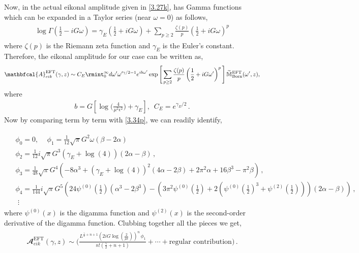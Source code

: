 \noindent 
Now, in the actual eikonal amplitude given in \eqref{3.27k}, has Gamma functions which can be expanded in a Taylor series (near $\omega=0$) as follows,
\begin{align}
 \begin{split}
\log{\Gamma\left(\frac{1}{2}-iG\omega\right)}=\gamma_E\left(\frac{1}{2}+i G\omega\right)+\sum_{p\geq 2}\frac{\zeta(p)}{p}\left(\frac{1}{2}+iG\omega\right)^{p}
 \end{split}   \end{align}
where $\zeta(p)$ is the Riemann zeta function and $\gamma_E$ is the Euler's constant.
Therefore, the eikonal amplitude for our case can be written as,
 \begin{align}
     \begin{split}
  \mathbfcal{A}^{\textrm{EFT}}_{eik}(\gamma,z)\sim C_E\rmint_0^\infty d\omega'\omega'^{\gamma/2-1}e^{i b \omega'}\exp\Bigg[\sum_{p\geq 2}\frac{\zeta(p)}{p}\left(\frac{1}{2}+iG\omega'\right)^{p}\Bigg]\,{\widetilde{\mathbb{M}}^{\textrm{EFT}}_{\textrm{Born}}(\omega',z)},
     \end{split}
 \end{align}
where \begin{align}
    b=G\left[\log\Bigg(\frac{ 4}{\mu^2 \epsilon^2}\Bigg)+\gamma_E\right],\,\,\, C_E=e^{\gamma_E /2}\,.
\end{align}
 Now by comparing term by term with  \eqref{3.34p}, we can readily identify,

\begin{align}\begin{split}
\label{3.36m}
 &\phi_0=0,\,\,\,\,\,\,\,\phi_1=\frac{1}{12} \sqrt{\pi } G^2 \omega  (\beta -2 \alpha )\,\\&\phi_2=\frac{1}{12} i \sqrt{\pi } G^3 (\gamma_E +\log (4)) (2 \alpha -\beta )\,,\\&\phi_3=\frac{1}{48} \sqrt{\pi } G^4 \left(-8 \alpha ^3+(\gamma_E +\log (4))^2 (4 \alpha -2 \beta )+2 \pi ^2 \alpha +16 \beta^3-\pi ^2 \beta \right)\,,\\&
 \phi_4=\frac{1}{144} i \sqrt{\pi } G^5 \left(24 \psi ^{(0)}\left(\frac{1}{2}\right) \left(\alpha ^3-2 \beta ^3\right)-\left(3 \pi ^2 \psi ^{(0)}\left(\frac{1}{2}\right)+2 \left(\psi ^{(0)}\left(\frac{1}{2}\right)^3+\psi ^{(2)}\left(\frac{1}{2}\right)\right)\right) (2 \alpha -\beta )\right)\,,\\&\,\, \vdots
 \end{split} 
\end{align}
\noindent
where $\psi^{(0)}(x)$ is the digamma function and $\psi^{(2)}(x)$ is the second-order derivative of the digamma function.
Clubbing together all the pieces we get,
\begin{align}
    \begin{split}
\mathbfcal{A}^{\textrm{EFT}}_{eik}(\gamma,z)\sim\Bigg(\frac{L^{\frac{\gamma}{2}+n+1}\left(2i G \log(\frac{2}{\mu\epsilon})\right)^n\,\phi_1}{n!(\frac{\gamma}{2}+n+1)}+\cdots+\text{regular contribution}\Bigg)\,.
    \end{split} \label{eqnnn}
\end{align}

